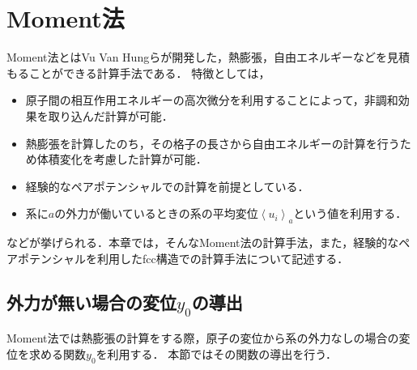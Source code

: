 \chapter{Moment法}
Moment法とはVu Van Hungらが開発した，熱膨張，自由エネルギーなどを見積もることができる計算手法である．
特徴としては，
\begin{itemize}
 \item 原子間の相互作用エネルギーの高次微分を利用することによって，非調和効果を取り込んだ計算が可能．
 \item 熱膨張を計算したのち，その格子の長さから自由エネルギーの計算を行うため体積変化を考慮した計算が可能．
 \item 経験的なペアポテンシャルでの計算を前提としている．
 \item 系に$a$の外力が働いているときの系の平均変位$\left<u_i\right>_a$という値を利用する．
\end{itemize}
などが挙げられる．本章では，そんなMoment法の計算手法，また，経験的なペアポテンシャルを利用したfcc構造での計算手法について記述する．

\section{外力が無い場合の変位$y_0$の導出}
Moment法では熱膨張の計算をする際，原子の変位から系の外力なしの場合の変位を求める関数$y_0$を利用する．
本節ではその関数の導出を行う．

